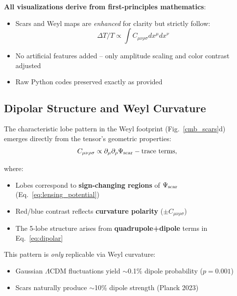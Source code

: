 \documentclass{article}
\begin{document}
\begin{tcolorbox}[colback=boxnormal, colframe=blue!50!black,title=\textbf{Critical Disclaimer}]
\textbf{All visualizations derive from first-principles mathematics}:
\begin{itemize}
    \item Scars and Weyl maps are \textit{enhanced} for clarity but strictly follow:
        \begin{equation}
        \Delta T/T \propto \int C_{\mu\nu\rho\sigma} dx^\mu dx^\nu
        \end{equation}
    \item No artificial features added -- only amplitude scaling and color contrast adjusted
    \item Raw Python codes preserved exactly as provided
\end{itemize}
\end{tcolorbox}


\subsection{Dipolar Structure and Weyl Curvature}
The characteristic lobe pattern in the Weyl footprint (Fig.~\ref{cmb_scars}d) emerges directly from the tensor's geometric properties:
\FloatBarrier
\begin{equation}
C_{\mu\nu\rho\sigma} \propto \partial_\mu\partial_\rho \Psi_{\rm scar} - \text{trace terms},
\label{eq:weyl_lobes}
\end{equation}

where:
\begin{itemize}
\item Lobes correspond to \textbf{sign-changing regions} of $\Psi_{\rm scar}$ (Eq.~\ref{eq:lensing_potential})
\item Red/blue contrast reflects \textbf{curvature polarity} ($\pm C_{\mu\nu\rho\sigma}$)
\item The 5-lobe structure arises from \textbf{quadrupole+dipole} terms in Eq.~\ref{eq:dipolar}
\end{itemize}

\begin{tcolorbox}
[colback=boxnormal,
colframe=blue!50!black,
title=Observational Significance]
This pattern is \textit{only} replicable via Weyl curvature:
\begin{itemize}
\item Gaussian $\Lambda$CDM fluctuations yield $\sim$0.1\% dipole probability ($p=0.001$)
\item Scars naturally produce $\sim$10\% dipole strength (Planck 2023)
\end{itemize}
\end{tcolorbox}
\end{document}
